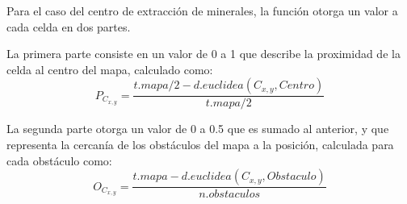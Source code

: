 Para el caso del centro de extracción de minerales, la función otorga un valor a cada celda en dos partes.

La primera parte consiste en un valor de 0 a 1 que describe la proximidad de la celda al centro del mapa, calculado como: $$P_{C_{x,y}}=\frac{t.mapa/2 - d.euclidea(C_{x,y},Centro)}{t.mapa/2}$$

La segunda parte otorga un valor de 0 a 0.5 que es sumado al anterior, y que representa la cercanía de los obstáculos del mapa a la posición, calculada para cada obstáculo como: $$O_{C_{x,y}}=\frac{t.mapa - d.euclidea(C_{x,y},Obstaculo)}{n.obstaculos} $$


